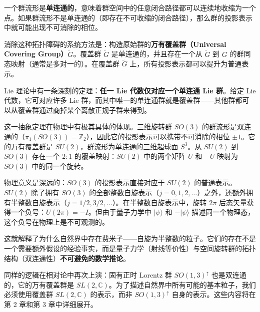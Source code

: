 一个群流形是\textbf{单连通的}，意味着群空间中的任意闭合路径都可以连续地收缩为一个点。如果群流形不是单连通的（即存在不可收缩的闭合路径），那么群的投影表示中就可能出现不可消除的相位。

消除这种拓扑障碍的系统方法是：构造原始群的\textbf{万有覆盖群（Universal Covering Group）}$\tilde{G}$。覆盖群 $\tilde{G}$ 是单连通的，并且存在一个从 $\tilde{G}$ 到 $G$ 的群同态映射（通常是多对一的）。在覆盖群 $\tilde{G}$ 上，所有投影表示都可以提升为普通表示。

Lie 理论中有一条深刻的定理：\textbf{任一 Lie 代数仅对应一个单连通 Lie 群}。给定 Lie 代数，它可对应许多 Lie 群，而其中唯一的单连通群就是覆盖群——其他群都可以从覆盖群通过商掉某个离散正规子群来得到。

这一抽象定理在物理中有极其具体的体现。三维旋转群 $SO(3)$ 的群流形是双连通的（$\pi_1(SO(3)) = \mathbb{Z}_2$），因此它的投影表示可以携带不可消除的相位 $\pm 1$。它的万有覆盖群是 $SU(2)$，群流形为单连通的三维超球面 $S^3$。从 $SU(2)$ 到 $SO(3)$ 存在一个 $2:1$ 的覆盖映射：$SU(2)$ 中的两个矩阵 $U$ 和 $-U$ 映射为 $SO(3)$ 中的同一个旋转。

物理意义是深远的：$SO(3)$ 的投影表示直接对应于 $SU(2)$ 的普通表示。$SU(2)$ 除了拥有 $SO(3)$ 的全部整数自旋表示（$j = 0, 1, 2, \ldots$）之外，还额外拥有半整数自旋表示（$j = 1/2, 3/2, \ldots$）。在半整数自旋表示中，旋转 $2\pi$ 后态矢量获得一个负号：$U(2\pi) = -I$。但由于量子力学中 $|\psi\rangle$ 和 $-|\psi\rangle$ 描述同一个物理态，这个负号在物理上是不可观测的。

这就解释了为什么自然界中存在费米子——自旋为半整数的粒子。它们的存在不是一个需要额外假设的经验事实，而是量子力学（射线等价性）与空间旋转群的拓扑结构（双连通性）\textbf{不可避免的数学推论}。

同样的逻辑在相对论中再次上演：固有正时 Lorentz 群 $SO(1,3)^\uparrow$ 也是双连通的，它的万有覆盖群是 $SL(2,\mathbb{C})$。为了描述自然界中所有可能的基本粒子，我们必须使用覆盖群 $SL(2,\mathbb{C})$ 的表示，而非 $SO(1,3)^\uparrow$ 自身的表示。这些内容将在第 2 章和第 3 章中详细展开。

